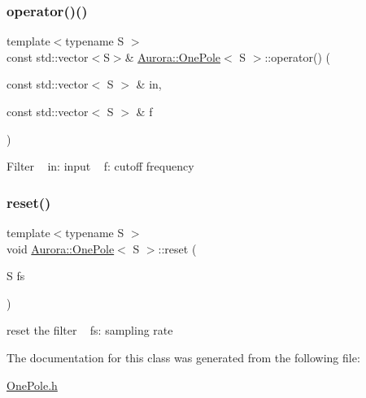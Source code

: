 \subsubsection{\texorpdfstring{operator()()}{operator()()}\hspace{0.1cm}{\footnotesize\ttfamily [2/2]}}
{\footnotesize\ttfamily template$<$typename S $>$ \\
const std\+::vector$<$S$>$\& \hyperlink{class_aurora_1_1_one_pole}{Aurora\+::\+One\+Pole}$<$ S $>$\+::operator() (\begin{DoxyParamCaption}\item[{const std\+::vector$<$ S $>$ \&}]{in,  }\item[{const std\+::vector$<$ S $>$ \&}]{f }\end{DoxyParamCaption})\hspace{0.3cm}{\ttfamily [inline]}}

Filter ~\newline
in\+: input ~\newline
f\+: cutoff frequency ~\newline
\mbox{\label{class_aurora_1_1_one_pole_ab9d69c4ceb9dbf5017fd800844f54dbf}} 
\subsubsection{\texorpdfstring{reset()}{reset()}}
{\footnotesize\ttfamily template$<$typename S $>$ \\
void \hyperlink{class_aurora_1_1_one_pole}{Aurora\+::\+One\+Pole}$<$ S $>$\+::reset (\begin{DoxyParamCaption}\item[{S}]{fs }\end{DoxyParamCaption})\hspace{0.3cm}{\ttfamily [inline]}}

reset the filter ~\newline
 fs\+: sampling rate 

The documentation for this class was generated from the following file\+:\begin{DoxyCompactItemize}
\item 
\hyperlink{_one_pole_8h}{One\+Pole.\+h}\end{DoxyCompactItemize}
